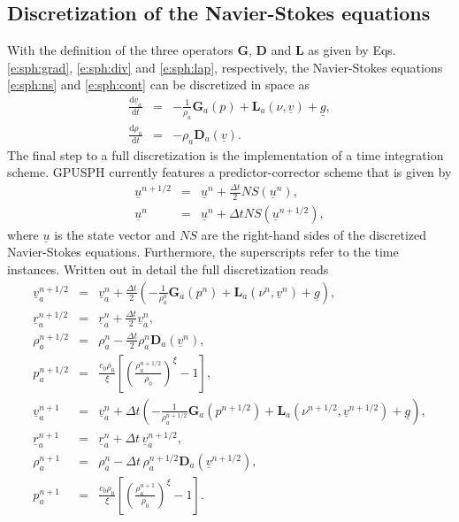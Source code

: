 \documentclass[12pt]{memoir}
\newcommand{\uvec}[1]{\underline{#1}}
\newcommand{\td}{\text{d}}
\newcommand{\tdv}[2]{\frac{\td #1}{\td #2}}
\newcommand{\Grad}{\textbf{G}}
\newcommand{\Div}{\textbf{D}}
\newcommand{\Lap}{\textbf{L}}
\begin{document}
\subsection{Discretization of the Navier-Stokes equations}
With the definition of the three operators $\Grad$, $\Div$ and $\Lap$ as
given by Eqs. \eqref{e:sph:grad}, \eqref{e:sph:div} and
\eqref{e:sph:lap}, respectively, the Navier-Stokes equations
\eqref{e:sph:ns} and \eqref{e:sph:cont} can be discretized in space as
\begin{eqnarray}
\tdv{\uvec{v}_a}{t} &=& - \frac{1}{\rho_a}\Grad_a(p) +
\Lap_a(\nu,\uvec{v}) + \uvec{g},
\label{e:sph:ns-disc}
\\
\tdv{\rho_a}{t} &=& -\rho_a \Div_a(\uvec{v}).
\label{e:sph:cont-disc}
\end{eqnarray}
The final step to a full discretization is the implementation of a time
integration scheme. GPUSPH currently features a predictor-corrector
scheme that is given by
\begin{eqnarray}
\uvec{u}^{n+1/2} &=& \uvec{u}^n + \frac{\Delta t}{2} NS(\uvec{u}^n),
\label{e:sph:pred-corr}
\\
\uvec{u}^{n} &=& \uvec{u}^n + \Delta t NS(\uvec{u}^{n+1/2}),
\nonumber
\end{eqnarray}
where $\uvec{u}$ is the state vector and $NS$ are the right-hand sides
of the discretized Navier-Stokes equations. Furthermore, the
superscripts refer to the time instances. Written out in detail
the full discretization reads
\begin{eqnarray}
\uvec{v}_a^{n+1/2} &=& \uvec{v}_a^n + \frac{\Delta t}{2} \left(
-\frac{1}{\rho^n_a}\Grad_a(p^n) + \Lap_a(\nu^n,\uvec{v}^n) + \uvec{g}
\right),
\label{e:sph:pred-corr-ns}
\\
\uvec{r}_a^{n+1/2} &=& \uvec{r}_a^{n} + \frac{\Delta t}{2}
\uvec{v}_a^{n},
\nonumber
\\
\rho_a^{n+1/2} &=& \rho_a^n - \frac{\Delta t}{2} \rho_a^n
\Div_a(\uvec{v}^n),
\nonumber
\\
p_a^{n+1/2} &=& \frac{c_0 \rho_0}{\xi}\left[ \left( \frac{\rho_a^{n+1/2}}{\rho_0}\right)^\xi
-1 \right],
\nonumber
\\
\uvec{v}_a^{n+1} &=& \uvec{v}_a^n + \Delta t \left(
-\frac{1}{\rho^{n+1/2}_a}\Grad_a(p^{n+1/2}) +
\Lap_a(\nu^{n+1/2},\uvec{v}^{n+1/2}) + \uvec{g}
\right),
\nonumber
\\
\uvec{r}_a^{n+1} &=& \uvec{r}_a^{n} + \Delta t\,
\uvec{v}_a^{n+1/2},
\nonumber
\\
\rho_a^{n+1} &=& \rho_a^n - \Delta t\, \rho_a^{n+1/2}
\Div_a(\uvec{v}^{n+1/2}),
\nonumber
\\
p_a^{n+1} &=& \frac{c_0 \rho_0}{\xi}\left[ \left( \frac{\rho_a^{n+1}}{\rho_0}\right)^\xi
-1 \right].
\nonumber
\end{eqnarray}
\end{document}
